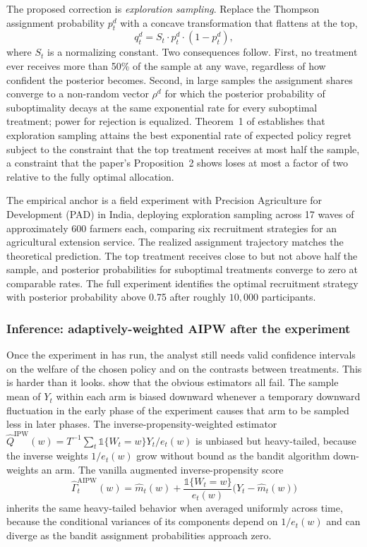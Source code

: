 The proposed correction is \emph{exploration sampling}. Replace the Thompson assignment probability $p_t^d$ with a concave transformation that flattens at the top,
\begin{equation}
q_t^d = S_t \cdot p_t^d \cdot (1 - p_t^d),
\label{eq:exploration_sampling}
\end{equation}
where $S_t$ is a normalizing constant. Two consequences follow. First, no treatment ever receives more than 50\% of the sample at any wave, regardless of how confident the posterior becomes. Second, in large samples the assignment shares converge to a non-random vector $\rho^d$ for which the posterior probability of suboptimality decays at the same exponential rate for every suboptimal treatment; power for rejection is equalized. Theorem~1 of \citet{kasy2021adaptive} establishes that exploration sampling attains the best exponential rate of expected policy regret subject to the constraint that the top treatment receives at most half the sample, a constraint that the paper's Proposition~2 shows loses at most a factor of two relative to the fully optimal allocation.

The empirical anchor is a field experiment with Precision Agriculture for Development (PAD) in India, deploying exploration sampling across 17 waves of approximately 600 farmers each, comparing six recruitment strategies for an agricultural extension service. The realized assignment trajectory matches the theoretical prediction. The top treatment receives close to but not above half the sample, and posterior probabilities for suboptimal treatments converge to zero at comparable rates. The full experiment identifies the optimal recruitment strategy with posterior probability above 0.75 after roughly $10{,}000$ participants.

\subsubsection*{Inference: adaptively-weighted AIPW after the experiment}

Once the experiment in \citet{kasy2021adaptive} has run, the analyst still needs valid confidence intervals on the welfare of the chosen policy and on the contrasts between treatments. This is harder than it looks. \citet{hadad2021adaptive} show that the obvious estimators all fail. The sample mean of $Y_t$ within each arm is biased downward whenever a temporary downward fluctuation in the early phase of the experiment causes that arm to be sampled less in later phases. The inverse-propensity-weighted estimator $\hat Q^{\text{IPW}}(w) = T^{-1} \sum_t \mathbb 1\{W_t = w\} Y_t / e_t(w)$ is unbiased but heavy-tailed, because the inverse weights $1/e_t(w)$ grow without bound as the bandit algorithm down-weights an arm. The vanilla augmented inverse-propensity score
\begin{equation}
\hat\Gamma_t^{\text{AIPW}}(w) = \hat m_t(w) + \frac{\mathbb 1\{W_t = w\}}{e_t(w)}\bigl(Y_t - \hat m_t(w)\bigr)
\label{eq:hadad_aipw_score}
\end{equation}
inherits the same heavy-tailed behavior when averaged uniformly across time, because the conditional variances of its components depend on $1/e_t(w)$ and can diverge as the bandit assignment probabilities approach zero.

